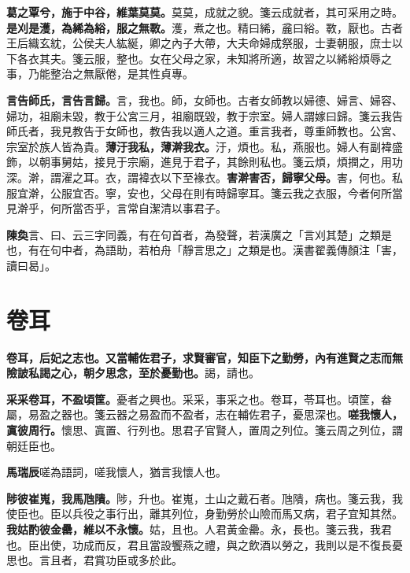 \textbf{葛之覃兮，施于中谷，維葉莫莫。}{\footnotesize 莫莫，成就之貌。箋云成就者，其可采用之時。}\textbf{是刈是濩，為絺為綌，服之無斁。}{\footnotesize 濩，煮之也。精曰絺，麄曰綌。斁，厭也。古者王后織玄紞，公侯夫人紘綖，卿之內子大帶，大夫命婦成祭服，士妻朝服，庶士以下各衣其夫。箋云服，整也。女在父母之家，未知將所適，故習之以絺綌煩辱之事，乃能整治之無厭倦，是其性貞專。}

\textbf{言告師氏，言告言歸。}{\footnotesize 言，我也。師，女師也。古者女師教以婦德、婦言、婦容、婦功，祖廟未毀，教于公宮三月，祖廟既毀，教于宗室。婦人謂嫁曰歸。箋云我告師氏者，我見教告于女師也，教告我以適人之道。重言我者，尊重師教也。公宮、宗室於族人皆為貴。}\textbf{薄汙我私，薄澣我衣。}{\footnotesize 汙，煩也。私，燕服也。婦人有副褘盛飾，以朝事舅姑，接見于宗廟，進見于君子，其餘則私也。箋云煩，煩撋之，用功深。澣，謂濯之耳。衣，謂褘衣以下至褖衣。}\textbf{害澣害否，歸寧父母。}{\footnotesize 害，何也。私服宜澣，公服宜否。寧，安也，父母在則有時歸寧耳。箋云我之衣服，今者何所當見澣乎，何所當否乎，言常自潔清以事君子。}

\begin{quoting}\textbf{陳奐}言、曰、云三字同義，有在句首者，為發聲，若漢廣之「言刈其楚」之類是也，有在句中者，為語助，若柏舟「靜言思之」之類是也。漢書翟義傳顏注「害，讀曰曷」。\end{quoting}

\section{卷耳}


\textbf{卷耳，后妃之志也。又當輔佐君子，求賢審官，知臣下之勤勞，內有進賢之志而無險詖私謁之心，朝夕思念，至於憂勤也。}{\footnotesize 謁，請也。}

\textbf{采采卷耳，不盈頃筐。}{\footnotesize 憂者之興也。采采，事采之也。卷耳，苓耳也。頃筐，畚屬，易盈之器也。箋云器之易盈而不盈者，志在輔佐君子，憂思深也。}\textbf{嗟我懷人，寘彼周行。}{\footnotesize 懷思、寘置、行列也。思君子官賢人，置周之列位。箋云周之列位，謂朝廷臣也。}

\begin{quoting}\textbf{馬瑞辰}嗟為語詞，嗟我懷人，猶言我懷人也。\end{quoting}

\textbf{陟彼崔嵬，我馬虺隤。}{\footnotesize 陟，升也。崔嵬，土山之戴石者。虺隤，病也。箋云我，我使臣也。臣以兵役之事行出，離其列位，身勤勞於山險而馬又病，君子宜知其然。}\textbf{我姑酌彼金罍，維以不永懷。}{\footnotesize 姑，且也。人君黃金罍。永，長也。箋云我，我君也。臣出使，功成而反，君且當設饗燕之禮，與之飲酒以勞之，我則以是不復長憂思也。言且者，君賞功臣或多於此。}

